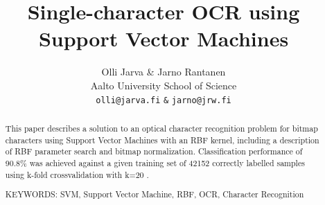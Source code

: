 \documentclass{netsec2012}
\begin{document}

\title{Single-character OCR using Support Vector Machines}

\author{Olli Jarva \& Jarno Rantanen \\
        Aalto University School of Science \\
	\texttt{olli@jarva.fi} \texttt{\&} \texttt{jarno@jrw.fi}}
\maketitle


\begin{abstract}

This paper describes a solution to an optical character recognition problem for bitmap characters
using Support Vector Machines with an RBF kernel, including a description of RBF parameter search
and bitmap normalization.  Classification performance of 90.8\% was achieved against a given
training set of 42152 correctly labelled samples using k-fold crossvalidation with k=20
\cite{training_set}.

\vspace{3mm}
\noindent KEYWORDS: SVM, Support Vector Machine, RBF, OCR, Character Recognition

\end{abstract}





\end{document}
